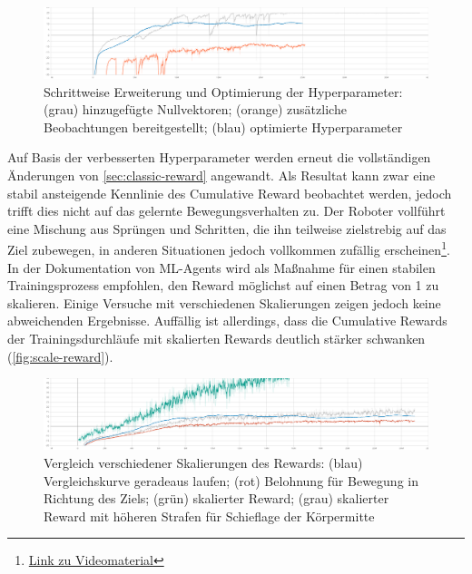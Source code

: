 \begin{figure}
    \centering
    \includegraphics[width = \textwidth]{Bilder/ml-agents/Environment_Cumulative Reward-add-observations.pdf}
    \caption[Schrittweise Erweiterung und Optimierung der Hyperparameter]{Schrittweise Erweiterung und Optimierung der Hyperparameter: (grau) hinzugefügte Nullvektoren; (orange) zusätzliche Beobachtungen bereitgestellt; (blau) optimierte Hyperparameter}
    \label{fig:optimierte-hyperparameter}
\end{figure}

Auf Basis der verbesserten Hyperparameter werden erneut die vollständigen Änderungen von \autoref{sec:classic-reward} angewandt.
Als Resultat kann zwar eine stabil ansteigende Kennlinie des Cumulative Reward beobachtet werden, jedoch trifft dies nicht auf das gelernte Bewegungsverhalten zu.
Der Roboter vollführt eine Mischung aus Sprüngen und Schritten, die ihn teilweise zielstrebig auf das Ziel zubewegen, in anderen Situationen jedoch vollkommen zufällig erscheinen\footnote{\href{https://github.com/yschiebelhut/studienarbeit-doc/raw/master/Videos/SpiderBotDemos/14a-calmed-reward-scaled.webm}{Link zu Videomaterial}}.
In der Dokumentation von ML-Agents wird als Maßnahme für einen stabilen Trainingsprozess empfohlen, den Reward möglichst auf einen Betrag von 1 zu skalieren.
Einige Versuche mit verschiedenen Skalierungen zeigen jedoch keine abweichenden Ergebnisse.
Auffällig ist allerdings, dass die Cumulative Rewards der Trainingsdurchläufe mit skalierten Rewards deutlich stärker schwanken (\autoref{fig:scale-reward}).

\begin{figure}
    \centering
    \includegraphics[width = \textwidth]{Bilder/ml-agents/Environment_Cumulative Reward-scale-reward.pdf}
    \caption[Vergleich verschiedener Skalierungen des Rewards]{Vergleich verschiedener Skalierungen des Rewards: (blau) Vergleichskurve geradeaus laufen; (rot) Belohnung für Bewegung in Richtung des Ziels; (grün) skalierter Reward; (grau) skalierter Reward mit höheren Strafen für Schieflage der Körpermitte}
    \label{fig:scale-reward}
\end{figure}

